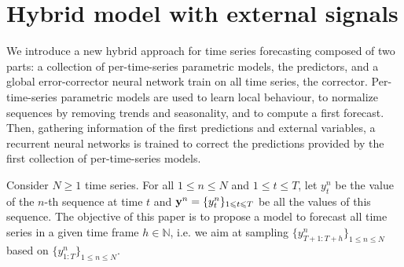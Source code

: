 \documentclass{article} %
\newcommand{\ts}{y}
\newcommand{\fullts}{{\bf \ts}}
\newcommand{\lag}{h}
\begin{document}
\section{Hybrid model with external signals}
\label{sec:hybrid}
We introduce a new hybrid approach for time series forecasting  composed of two parts: a collection of per-time-series parametric models, the predictors, and a global error-corrector neural network train on all time series, the corrector. Per-time-series parametric models are used to learn local behaviour, to normalize sequences by removing trends and seasonality,  and to compute a first forecast. Then, gathering information of the first predictions and external variables, a recurrent neural networks is trained to correct the predictions provided by the first collection of per-time-series models.

Consider $N\geqslant 1$ time series. For all $1\leqslant n \leqslant N$ and $1\leqslant t \leqslant T$, let $\ts_t^n$ be the value of the $n$-th sequence at time $t$ and  $\fullts^n = \{\ts_t^n\}_{1\leqslant t \leqslant T}$ be all the values of this sequence.   The objective of this paper is to propose a model to  forecast all time series in a given time frame  $\lag \in \mathbb{N}$, i.e. we aim at sampling $\{\ts^n_{T+1:T+\lag}\}_{1\leqslant n \leqslant N}$ based on $\{\ts^n_{1:T}\}_{1\leqslant n \leqslant N}$.

\end{document}
